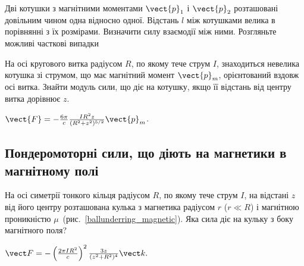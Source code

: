 \begin{problem}
    Дві котушки з магнітними моментами $\vect{p}_1$ і $\vect{p}_2$ розташовані довільним чином одна відносно одної. Відстань $l$ між котушками велика в порівнянні з їх розмірами. Визначити силу взаємодії між ними. Розгляньте можливі часткові випадки
\end{problem}

\begin{problem}
    На осі кругового витка радіусом $R$, по якому тече струм $I$, знаходиться невелика котушка зі струмом, що має магнітний момент $\vect{p}_m$, орієнтований вздовж осі витка. Знайти модуль сили, що діє на котушку, якщо її відстань від центру витка дорівнює $z$.
\begin{solution}
	$\vect{F} = -\frac{6\pi}{c}\frac{IR^2z}{(R^2 + z^2)^{5/2}}\vect{p}_m$.
\end{solution}
\end{problem}



%

\subsection*{Пондеромоторні сили, що діють на магнетики в магнітному полі}


\begin{problem}\label{prb:ballunderring_magnetic}
На осі симетрії тонкого кільця радіусом $R$, по якому тече струм $I$, на відстані $z$ від його центру розташована кулька з магнетика радіусом $r$ ($r \ll R$) і магнітною проникністю $\mu$~(рис.~\ref{ballunderring_magnetic}). Яка сила діє на кульку з боку магнітного поля?
\begin{solution}
	$\vect F = - \left( \frac{2\pi IR^2}{c}\right)^2 \frac{3z}{(z^2 + R^2)^4} \vect k.$
\end{solution}
\end{problem}

